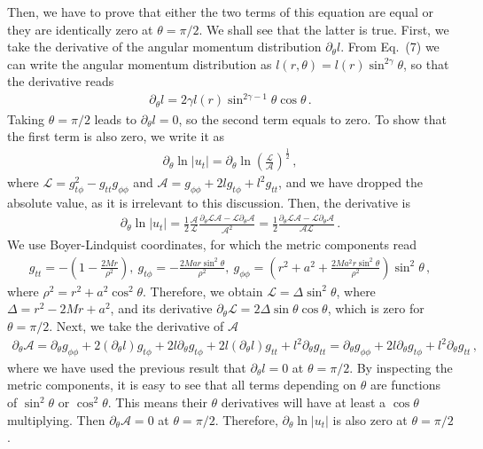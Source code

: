 \documentclass{article}
\begin{document}
Then, we have to prove that either the two terms of this equation are equal or they  are identically zero at $\theta = \pi/2$. We shall see that the latter is true.
First, we take the derivative of the angular momentum distribution $\partial_{\theta} l$. From Eq.~(7) we can write the angular momentum distribution as $l(r, \theta) = l(r) \sin^{2\gamma} \theta$, so that the derivative reads
\begin{eqnarray*}
\partial_{\theta} l = 2\gamma l(r) \sin^{2\gamma - 1} \theta \cos \theta \,.
\end{eqnarray*}
Taking $\theta = \pi/2$ leads to $\partial_{\theta} l = 0$, so the second term equals to zero.
To show that the first term is also zero, we write it as
\begin{eqnarray*}
\partial_{\theta} \ln|u_t| = \partial_{\theta} \ln \left(\frac{\mathcal{L}}{\mathcal{A}}\right)^{\frac{1}{2}}\,,
\end{eqnarray*}
where $\mathcal{L} = g_{t \phi}^2 - g_{tt} g_{\phi\phi}$ and $\mathcal{A} = g_{\phi\phi} + 2 l g_{t\phi} + l^2g_{tt}$, and we have dropped the absolute value, as it is irrelevant to this discussion. Then, the derivative is
\begin{eqnarray*}
\partial_{\theta} \ln|u_t| = \frac{1}{2} \frac{\mathcal{A}}{\mathcal{L}}\frac{\partial_{\theta}{\mathcal{L}}\mathcal{A} - \mathcal{L}\partial_{\theta}\mathcal{A}}{\mathcal{A}^2} = \frac{1}{2} \frac{\partial_{\theta}{\mathcal{L}}\mathcal{A} - \mathcal{L}\partial_{\theta}\mathcal{A}}{\mathcal{A} \mathcal{L}}\,.
\end{eqnarray*}
We use Boyer-Lindquist coordinates, for which the metric components read
\begin{eqnarray*}
g_{tt} = - \left(1 - \frac{2Mr}{\rho^2}\right), \ g_{t\phi} = -\frac{2Mar\sin^2\theta}{\rho^2}, \ g_{\phi\phi} = \left(r^2 + a^2 + \frac{2Ma^2r\sin^2\theta}{\rho^2}\right) \sin^2 \theta\,,
\end{eqnarray*}
where $\rho^2 = r^2 + a^2\cos^2 \theta$. Therefore, we obtain $\mathcal{L} = \Delta \sin^2 \theta$, where $\Delta = r^2 - 2Mr + a^2$, and its derivative $\partial_{\theta}\mathcal{L} = 2 \Delta \sin \theta \cos \theta$, which is zero for $\theta = \pi/2$. Next, we take the derivative of $\mathcal{A}$
\begin{eqnarray*}
\partial_{\theta} \mathcal{A} = \partial_{\theta} g_{\phi\phi} + 2 (\partial_{\theta} l) g_{t\phi} + 2l\partial_{\theta} g_{t\phi} + 2l(\partial_{\theta} l) g_{tt} + l^2 \partial_{\theta} g_{tt} = \partial_{\theta} g_{\phi\phi} + 2l\partial_{\theta} g_{t\phi} + l^2 \partial_{\theta} g_{tt}\,,
\end{eqnarray*}
where we have used the previous result that $\partial_{\theta} l=0$ at $\theta = \pi/2$. By inspecting the metric components, it is easy to see that all terms depending on $\theta$ are functions of $\sin^2 \theta$ or $\cos^2 \theta$. This means their $\theta$ derivatives will have at least a $\cos \theta$ multiplying. Then $\partial_{\theta} \mathcal{A} = 0$ at $\theta = \pi/2$. Therefore, $\partial_{\theta} \ln|u_t|$ is also zero at $\theta = \pi/2$.
\end{document}
